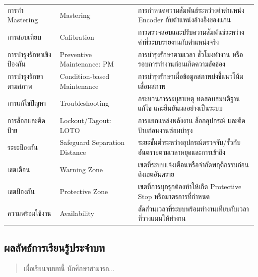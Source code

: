 \begin{table}[htbp]
\begin{tabularx}{\textwidth}{@{}L{0.22\textwidth}L{0.28\textwidth}Y@{}}
        การทำ Mastering & Mastering & การกำหนดความสัมพันธ์ระหว่างค่าตำแหน่ง Encoder กับตำแหน่งอ้างอิงของแกน \\
        การสอบเทียบ & Calibration & การตรวจสอบและปรับความสัมพันธ์ระหว่างค่าที่ระบบรายงานกับตำแหน่งจริง \\
        การบำรุงรักษาเชิงป้องกัน & Preventive Maintenance: PM & การบำรุงรักษาตามเวลา ชั่วโมงทำงาน หรือรอบการทำงานก่อนเกิดความขัดข้อง \\
        การบำรุงรักษาตามสภาพ & Condition-based Maintenance & การบำรุงรักษาเมื่อข้อมูลสภาพบ่งชี้แนวโน้มเสื่อมสภาพ \\
        การแก้ไขปัญหา & Troubleshooting & กระบวนการระบุสาเหตุ ทดสอบสมมติฐาน แก้ไข และยืนยันผลอย่างเป็นระบบ \\
        การล็อกและติดป้าย & Lockout/Tagout: LOTO & การแยกแหล่งพลังงาน ล็อกอุปกรณ์ และติดป้ายก่อนงานซ่อมบำรุง \\
        ระยะป้องกัน & Safeguard Separation Distance & ระยะขั้นต่ำระหว่างอุปกรณ์ตรวจจับ/รั้วกับอันตรายตามเวลาหยุดและการเข้าถึง \\
        เขตเตือน & Warning Zone & เขตที่ระบบแจ้งเตือนหรือจำกัดพฤติกรรมก่อนถึงเขตอันตราย \\
        เขตป้องกัน & Protective Zone & เขตที่การบุกรุกต้องทำให้เกิด Protective Stop หรือมาตรการที่กำหนด \\
        ความพร้อมใช้งาน & Availability & สัดส่วนเวลาที่ระบบพร้อมทำงานเทียบกับเวลาที่วางแผนให้ทำงาน \\
        \hline
    \end{tabularx}
\end{table}

\subsection{ผลลัพธ์การเรียนรู้ประจำบท}

\begin{quote}
เมื่อเรียนจบบทนี้ นักศึกษาสามารถ...
\end{quote}


